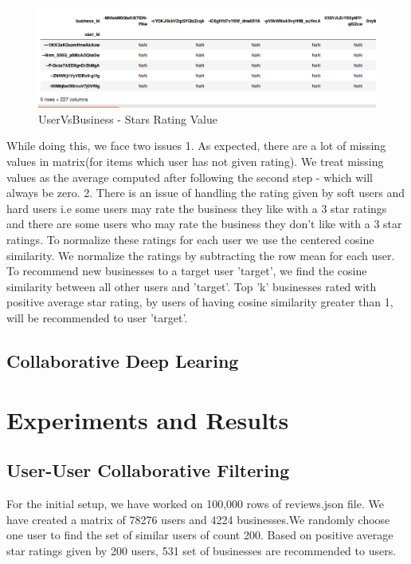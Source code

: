 \documentclass[11pt]{article}
\begin{document}
	 		\begin{figure}[h]
					\centering
					\includegraphics[scale=0.5]{uservsitem.png}
					\caption{UserVsBusiness - Stars Rating Value}
			\end{figure}
	 
While doing this, we face two issues 
1. As expected, there are a lot of missing values in matrix(for items which user has not given rating). We treat missing values as the average computed after following the second step - which will always be zero.
2. There is an issue of handling the rating given by soft users and hard users i.e some users may rate the business they like with a 3 star ratings and there are some users who may rate the business they don't like with a 3 star ratings. To normalize these ratings for each user we use the centered cosine similarity. We normalize the ratings by subtracting the row mean for each user.\cite{vid1}\\

To recommend new businesses to a target user 'target', we find the cosine similarity between all other users and 'target'. Top 'k' businesses rated with positive average star rating, by users of having cosine similarity greater than 1, will be recommended to user 'target'.\cite{vid2}
	
		\subsection{Collaborative Deep Learing}
		
		
		
	
	\section{Experiments and Results}
	
	\subsection{User-User Collaborative Filtering}

	For the initial setup, we have worked on 100,000 rows of reviews.json file. We have created a matrix of 78276 users and 4224 businesses.We randomly choose one user to find the set of similar users of count 200. Based on positive average star ratings given by 200 users, 531 set of businesses are recommended to users.
	
\end{document}

